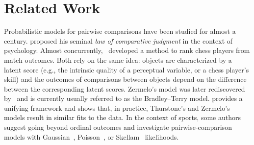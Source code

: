 \section{Related Work}
\label{kks:sec:relwork}

Probabilistic models for pairwise comparisons have been studied for almost a century.
\citet{thurstone1927law} proposed his seminal \emph{law of comparative judgment} in the context of psychology.
Almost concurrently,~\citet{zermelo1928berechnung} developed a method to rank chess players from match outcomes.
Both rely on the same idea: objects are characterized by a latent score (e.g., the intrinsic quality of a perceptual variable, or a chess player's skill) and the outcomes of comparisons between objects depend on the difference between the corresponding latent scores.
Zermelo's model was later rediscovered by~\citet{bradley1952rank} and is currently usually referred to as the Bradley--Terry model.
\citet{stern1992all} provides a unifying framework and shows that, in practice, Thurstone's and Zermelo's models result in similar fits to the data.
In the context of sports, some authors suggest going beyond ordinal outcomes and investigate pairwise-comparison models with Gaussian~\citep{guo2012score}, Poisson~\citep{maher1982modelling, guo2012score}, or Skellam~\citep{karlis2009bayesian} likelihoods.


